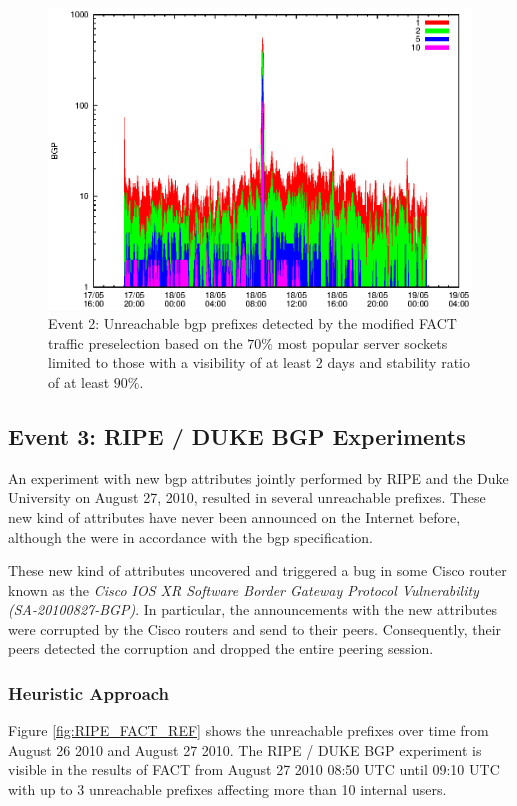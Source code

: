 \begin{figure}
	[p] \centering 
	\includegraphics[width=0.75\linewidth]{images/events/2010_05_18/bgp_log_Set_var_0_1_stab_9_vts_2.eps} \caption{Event 2: Unreachable \gls{bgp} prefixes detected by the modified \gls{FACT} traffic preselection based on the $70\%$ most popular \glspl{server socket} limited to those with a visibility of at least 2 days and stability ratio of at least $90\%$.} 
	\label{fig:TIER1_FACT_popularVTS2STAB9} 
\end{figure}

\newpage 
\subsection{Event 3: RIPE / DUKE BGP Experiments}

An experiment with new \gls{bgp} attributes jointly performed by RIPE and the Duke University on August 27, 2010, resulted in several unreachable prefixes\citep{SchatzmannPAM2011}. 
These new kind of attributes have never been announced on the Internet before, although the were in accordance with the \gls{bgp} specification\citep{ripe_duke}.

These new kind of attributes uncovered and triggered a bug in some Cisco router known as the \emph{Cisco IOS XR Software Border Gateway Protocol Vulnerability (SA-20100827-BGP)}\citep{cisco_vulnerability}. 
In particular, the announcements with the new attributes were corrupted by the Cisco routers and send to their peers. 
Consequently, their peers detected the corruption and dropped the entire peering session\citep{ripe_duke}.

\subsubsection{Heuristic Approach} 
Figure \ref{fig:RIPE_FACT_REF} shows the unreachable prefixes over time from August 26 2010 and August 27 2010. 
The RIPE / DUKE BGP experiment is visible in the results of \gls{FACT} from August 27 2010 08:50 UTC until 09:10 UTC with up to 3 unreachable prefixes affecting more than 10 internal users. 

